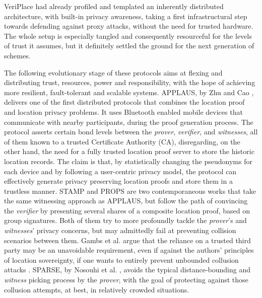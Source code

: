 VeriPlace \cite{luo2010veriplace} had already profiled and templated an inherently distributed architecture, with built-in privacy awareness, taking a first infrastructural step towards defending against proxy attacks, without the need for trusted hardware. The whole setup is especially tangled and consequently resourceful for the levels of trust it assumes, but it definitely settled the ground for the next generation of \pol{} schemes. 

The following evolutionary stage of these protocols aims at flexing and distributing trust, resources, power and responsibility, with the hope of achieving more resilient, fault-tolerant and scalable systems. APPLAUS, by Zhu and Cao \cite{zhu2011applaus}, delivers one of the first distributed protocols that combines the location proof and location privacy problems. It uses Bluetooth enabled mobile devices that communicate with nearby participants, during the proof generation process. The protocol asserts certain bond levels between the \emph{prover}, \emph{verifier}, and \emph{witnesses}, all of them known to a trusted Certificate Authority (CA), disregarding, on the other hand, the need for a fully trusted location proof server to store the historic location records. The claim is that, by statistically changing the pseudonyms for each device and by following a user-centric privacy model, the protocol can effectively generate privacy preserving location proofs and store them in a trustless manner. STAMP \cite{wang2016stamp} and PROPS \cite{gambs2014props} are two contemporaneous works that take the same witnessing approach as APPLAUS, but follow the path of convincing the \emph{verifier} by presenting several shares of a composite location proof, based on group signatures. Both of them try to more profoundly tackle the \emph{prover}'s and \emph{witnesses}' privacy concerns, but may admittedly fail at preventing collision scenarios between them. Gambs et al. argue that the reliance on a trusted third party may be an unavoidable requirement, even if against the authors' principles of location sovereignty, if one wants to entirely prevent unbounded collusion attacks \cite{gambs2014props}. SPARSE, by Nosouhi et al. \cite{nosouhi2018sparse}, avoids the typical distance-bounding and \emph{witness} picking process by the \emph{prover}, with the goal of protecting against those collusion attempts, at best, in relatively crowded situations.

